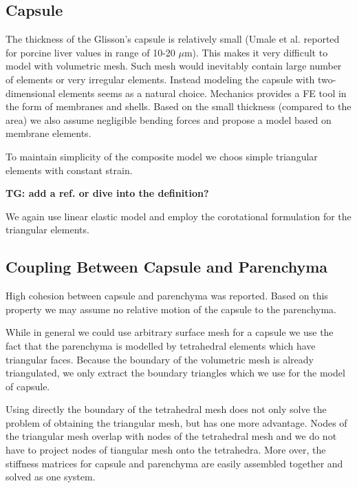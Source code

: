 \documentclass{llncs}
\newcommand{\TG}[1]{{\color{blue}\textbf{TG: #1}}}
\begin{document}

\subsection{Capsule} %

The thickness of the Glisson's capsule is relatively small (Umale et al.
\cite{Umale2011} reported for porcine liver values in range of 10-20
$\mu$m). This makes it very difficult to model with volumetric mesh. Such
mesh would inevitably contain large number of elements or very irregular
elements. Instead modeling the capsule with two-dimensional elements seems
as a natural choice. Mechanics provides a FE tool in the form of membranes
and shells. Based on the small thickness (compared to the area) we also
assume negligible bending forces and propose a model based on membrane
elements. 

To maintain simplicity of the composite model we choos simple triangular
elements with constant strain.

\TG{add a ref. or dive into the definition?}

We again use linear elastic model and employ the  corotational formulation
for the triangular elements.




\subsection{Coupling Between Capsule and Parenchyma} %

High cohesion between capsule and parenchyma was reported. Based on this
property we may assume no relative motion of the capsule to the parenchyma.

While in general we could use arbitrary surface mesh for a capsule we use
the fact that the parenchyma is modelled by tetrahedral elements which have
triangular faces. Because the boundary of the volumetric mesh is already
triangulated, we only extract the boundary triangles which we use for the
model of capsule.

Using directly the boundary of the tetrahedral mesh does not only solve the
problem of obtaining the triangular mesh, but has one more advantage. Nodes
of the triangular mesh overlap with nodes of the tetrahedral mesh and we do
not have to project nodes of tiangular mesh onto the tetrahedra. More over,
the stiffness matrices for capsule and parenchyma are easily assembled
together and solved as one system.
\end{document}
